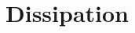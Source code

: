 \documentclass{agujournal}
\begin{document}
{%


%
%
%
%
\appendix
   \section{Dissipation}\label{sec:dissipation}
}
\end{document}
